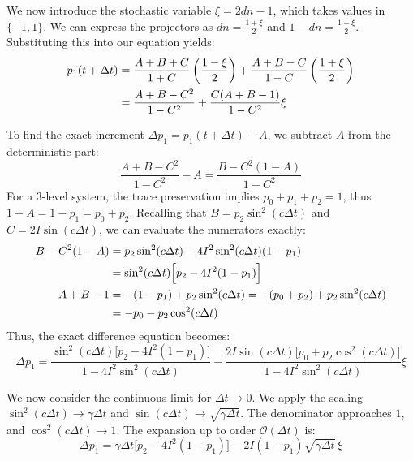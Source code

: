 \documentclass[a4paper,12pt]{article}
\begin{document}
We now introduce the stochastic variable $\xi = 2dn - 1$, which takes values in $\{-1, 1\}$. We can express the projectors as $dn = \frac{1 + \xi}{2}$ and $1 - dn = \frac{1 - \xi}{2}$. Substituting this into our equation yields:
\begin{align}
	p_1(t+\Delta t) &= \frac{A + B + C}{1 + C} \left( \frac{1 - \xi}{2} \right) + \frac{A + B - C}{1 - C} \left( \frac{1 + \xi}{2} \right) \notag \\
	&= \frac{A + B - C^2}{1 - C^2} + \frac{C(A + B - 1)}{1 - C^2} \xi
\end{align}

To find the exact increment $\Delta p_1 = p_1(t+\Delta t) - A$, we subtract $A$ from the deterministic part:
\begin{equation}
	\frac{A + B - C^2}{1 - C^2} - A = \frac{B - C^2(1 - A)}{1 - C^2}
\end{equation}
For a 3-level system, the trace preservation implies $p_0 + p_1 + p_2 = 1$, thus $1 - A = 1 - p_1 = p_0 + p_2$. 
Recalling that $B = p_2\sin^2(c\Delta t)$ and $C = 2I\sin(c\Delta t)$, we can evaluate the numerators exactly:
\begin{align}
	B - C^2(1 - A) &= p_2\sin^2(c\Delta t) - 4I^2\sin^2(c\Delta t)(1 - p_1) \notag \\
	&= \sin^2(c\Delta t) \Big[ p_2 - 4I^2(1 - p_1) \Big] \\
	A + B - 1 &= -(1 - p_1) + p_2\sin^2(c\Delta t) = -(p_0 + p_2) + p_2\sin^2(c\Delta t) \notag \\
	&= -p_0 - p_2\cos^2(c\Delta t)
\end{align}
Thus, the exact difference equation becomes:
\begin{equation}
	\Delta p_1 = \frac{\sin^2(c\Delta t) \big[ p_2 - 4I^2(1 - p_1) \big]}{1 - 4I^2\sin^2(c\Delta t)} - \frac{2I\sin(c\Delta t) \big[ p_0 + p_2\cos^2(c\Delta t) \big]}{1 - 4I^2\sin^2(c\Delta t)} \xi
\end{equation}

We now consider the continuous limit for $\Delta t \to 0$. We apply the scaling $\sin^2(c\Delta t) \to \gamma \Delta t$ and $\sin(c\Delta t) \to \sqrt{\gamma \Delta t}$. The denominator approaches $1$, and $\cos^2(c\Delta t) \to 1$. The expansion up to order $\mathcal{O}(\Delta t)$ is:
\begin{equation}
	\Delta p_1 = \gamma \Delta t \Big[ p_2 - 4I^2(1 - p_1) \Big] - 2I (1 - p_1) \sqrt{\gamma \Delta t} \, \xi
\end{equation}
\end{document}
